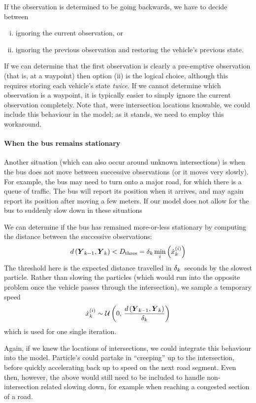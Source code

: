 If the observation is determined to be going backwards, we have to decide between
\begin{enumerate}[i.]
\item ignoring the current observation, or
\item ignoring the previous observation and restoring the vehicle's previous state.
\end{enumerate}
If we can determine that the first observation is clearly a pre-emptive observation (that is, at a waypoint) then option (ii) is the logical choice, although this requires storing each vehicle's state \emph{twice}. If we cannot determine which observation is a waypoint, it is typically easier to simply ignore the current observation completely. Note that, were intersection locations knowable, we could include this behaviour in the model; as it stands, we need to employ this workaround.


\paragraph{When the bus remains stationary}

Another situation (which can also occur around unknown intersections) is when the bus does not move between successive observations (or it moves very slowly). For example, the bus may need to turn onto a major road, for which there is a queue of traffic. The bus will report its position when it arrives, and may again report its position after moving a few meters. If our model does not allow for the bus to suddenly slow down in these situations


We can determine if the bus has remained more-or-less stationary by computing the distance between the successive observations:
\begin{equation}
\label{eq:vehicle_dist_check}
d\left(\boldsymbol{Y}_{k-1}, \boldsymbol{Y}_k\right) < D_\text{thres} =
\delta_k \min_i\left(\dot x_k^{(i)}\right)
\end{equation}
The threshold here is the expected distance travelled in $\delta_k$~seconds by the slowest particle. Rather than slowing the particles (which would run into the opposite problem once the vehicle passes through the intersection), we sample a temporary speed
\begin{equation}
\label{eq:vehicle_temp_speed}
\dot x_k^{(i)} \sim
\mathcal{U}\left(0,\, \frac{d\left(\boldsymbol{Y}_{k-1}, \boldsymbol{Y}_k\right)}{\delta_k}\right)
\end{equation}
which is used for one single iteration.

Again, if we knew the locations of intersections, we could integrate this behaviour into the model. Particle's could partake in ``creeping'' up to the intersection, before quickly accelerating back up to speed on the next road segment. Even then, however, the above would still need to be included to handle non-intersection related slowing down, for example when reaching a congested section of a road.
